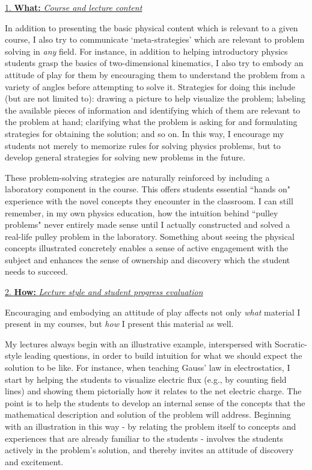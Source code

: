 \documentclass[12pt, tightenlines, onecolumn, showpacs, amsfonts, aps, prc, nofootinbib, floatfix]{revtex4-2}
\begin{document}
\medskip

\noindent \underline{1. \textbf{What:} \textit{Course and lecture content}}

\medskip
	
	In addition to presenting the basic physical content which is relevant to a given course, I also try to communicate `meta-strategies' which are relevant to problem solving in \textit{any} field.  For instance, in addition to helping introductory physics students grasp the basics of two-dimensional kinematics, I also try to embody an attitude of play for them by encouraging them to understand the problem from a variety of angles before attempting to solve it.  Strategies for doing this include (but are not limited to): drawing a picture to help visualize the problem; labeling the available pieces of information and identifying which of them are relevant to the problem at hand; clarifying what the problem is asking for and formulating strategies for obtaining the solution; and so on.  In this way, I encourage my students not merely to memorize rules for solving physics problems, but to develop general strategies for solving new problems in the future.

\medskip

These problem-solving strategies are naturally reinforced by including a laboratory component in the course.  This offers students essential ``hands on" experience with the novel concepts they encounter in the classroom.  I can still remember, in my own physics education, how the intuition behind ``pulley problems" never entirely made sense until I actually constructed and solved a real-life pulley problem in the laboratory.  Something about seeing the physical concepts illustrated concretely enables a sense of active engagement with the subject and enhances the sense of ownership and discovery which the student needs to succeed.

\newpage

\noindent \underline{2. \textbf{How:} \textit{Lecture style and student progress evaluation}}

\medskip
	
	Encouraging and embodying an attitude of play affects not only \textit{what} material I present in my courses, but \textit{how} I present this material as well.
	
\medskip

	My lectures always begin with an illustrative example, interspersed with Socratic-style leading questions, in order to build intuition for what we should expect the solution to be like.  For instance, when teaching Gauss' law in electrostatics, I start by helping the students to visualize electric flux (e.g., by counting field lines) and showing them pictorially how it relates to the net electric charge.  The point is to help the students to develop an internal sense of the concepts that the mathematical description and solution of the problem will address.  Beginning with an illustration in this way - by relating the problem itself to concepts and experiences that are already familiar to the students - involves the students actively in the problem's solution, and thereby invites an attitude of discovery and excitement.
\end{document}
